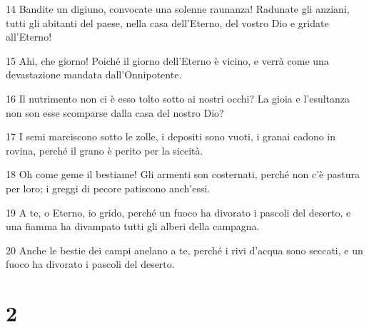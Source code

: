 \par 14 Bandite un digiuno, convocate una solenne raunanza! Radunate gli anziani, tutti gli abitanti del paese, nella casa dell'Eterno, del vostro Dio e gridate all'Eterno!
\par 15 Ahi, che giorno! Poiché il giorno dell'Eterno è vicino, e verrà come una devastazione mandata dall'Onnipotente.
\par 16 Il nutrimento non ci è esso tolto sotto ai nostri occhi? La gioia e l'esultanza non son esse scomparse dalla casa del nostro Dio?
\par 17 I semi marciscono sotto le zolle, i depositi sono vuoti, i granai cadono in rovina, perché il grano è perito per la siccità.
\par 18 Oh come geme il bestiame! Gli armenti son costernati, perché non c'è pastura per loro; i greggi di pecore patiscono anch'essi.
\par 19 A te, o Eterno, io grido, perché un fuoco ha divorato i pascoli del deserto, e una fiamma ha divampato tutti gli alberi della campagna.
\par 20 Anche le bestie dei campi anelano a te, perché i rivi d'acqua sono seccati, e un fuoco ha divorato i pascoli del deserto.

\chapter{2}

